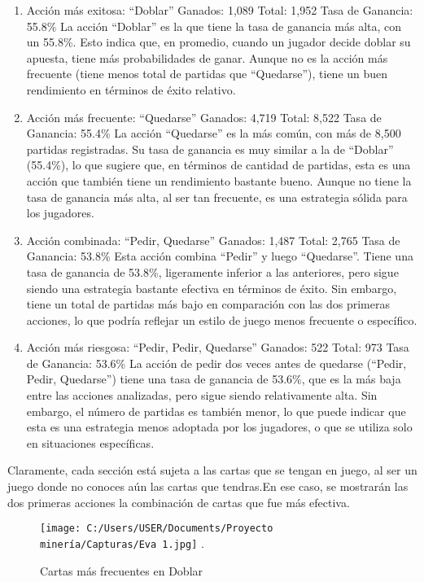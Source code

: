 \documentclass[conference,final,]{IEEEtran}
\begin{document}
\begin{enumerate}
\def\labelenumi{\arabic{enumi}.}
\item
  Acción más exitosa: ``Doblar'' Ganados: 1,089 Total: 1,952 Tasa de
  Ganancia: 55.8\% La acción ``Doblar'' es la que tiene la tasa de
  ganancia más alta, con un 55.8\%. Esto indica que, en promedio, cuando
  un jugador decide doblar su apuesta, tiene más probabilidades de
  ganar. Aunque no es la acción más frecuente (tiene menos total de
  partidas que ``Quedarse''), tiene un buen rendimiento en términos de
  éxito relativo.
\item
  Acción más frecuente: ``Quedarse'' Ganados: 4,719 Total: 8,522 Tasa de
  Ganancia: 55.4\% La acción ``Quedarse'' es la más común, con más de
  8,500 partidas registradas. Su tasa de ganancia es muy similar a la de
  ``Doblar'' (55.4\%), lo que sugiere que, en términos de cantidad de
  partidas, esta es una acción que también tiene un rendimiento bastante
  bueno. Aunque no tiene la tasa de ganancia más alta, al ser tan
  frecuente, es una estrategia sólida para los jugadores.
\item
  Acción combinada: ``Pedir, Quedarse'' Ganados: 1,487 Total: 2,765 Tasa
  de Ganancia: 53.8\% Esta acción combina ``Pedir'' y luego
  ``Quedarse''. Tiene una tasa de ganancia de 53.8\%, ligeramente
  inferior a las anteriores, pero sigue siendo una estrategia bastante
  efectiva en términos de éxito. Sin embargo, tiene un total de partidas
  más bajo en comparación con las dos primeras acciones, lo que podría
  reflejar un estilo de juego menos frecuente o específico.
\item
  Acción más riesgosa: ``Pedir, Pedir, Quedarse'' Ganados: 522 Total:
  973 Tasa de Ganancia: 53.6\% La acción de pedir dos veces antes de
  quedarse (``Pedir, Pedir, Quedarse'') tiene una tasa de ganancia de
  53.6\%, que es la más baja entre las acciones analizadas, pero sigue
  siendo relativamente alta. Sin embargo, el número de partidas es
  también menor, lo que puede indicar que esta es una estrategia menos
  adoptada por los jugadores, o que se utiliza solo en situaciones
  específicas.
\end{enumerate}

Claramente, cada sección está sujeta a las cartas que se tengan en
juego, al ser un juego donde no conoces aún las cartas que tendras.En
ese caso, se mostrarán las dos primeras acciones la combinación de
cartas que fue más efectiva.

\begin{figure}[htbp]
\centering
\texttt{[image: C:/Users/USER/Documents/Proyecto minería/Capturas/Eva 1.jpg]}
\DeclareGraphicsExtensions.
\caption{Cartas más frecuentes en Doblar}
\label{Evaluacion 1}
\end{figure}
\end{document}
